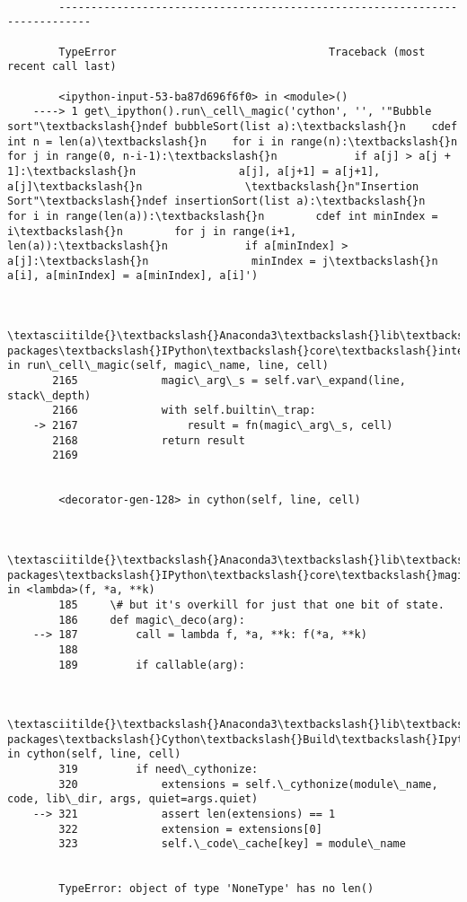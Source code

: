 \documentclass[11pt]{article}
\begin{document}
    \begin{Verbatim}[commandchars=\\\{\}]

        ---------------------------------------------------------------------------

        TypeError                                 Traceback (most recent call last)

        <ipython-input-53-ba87d696f6f0> in <module>()
    ----> 1 get\_ipython().run\_cell\_magic('cython', '', '"Bubble sort"\textbackslash{}ndef bubbleSort(list a):\textbackslash{}n    cdef int n = len(a)\textbackslash{}n    for i in range(n):\textbackslash{}n        for j in range(0, n-i-1):\textbackslash{}n            if a[j] > a[j + 1]:\textbackslash{}n                a[j], a[j+1] = a[j+1], a[j]\textbackslash{}n                \textbackslash{}n"Insertion Sort"\textbackslash{}ndef insertionSort(list a):\textbackslash{}n    for i in range(len(a)):\textbackslash{}n        cdef int minIndex = i\textbackslash{}n        for j in range(i+1, len(a)):\textbackslash{}n            if a[minIndex] > a[j]:\textbackslash{}n                minIndex = j\textbackslash{}n        a[i], a[minIndex] = a[minIndex], a[i]')
    

        \textasciitilde{}\textbackslash{}Anaconda3\textbackslash{}lib\textbackslash{}site-packages\textbackslash{}IPython\textbackslash{}core\textbackslash{}interactiveshell.py in run\_cell\_magic(self, magic\_name, line, cell)
       2165             magic\_arg\_s = self.var\_expand(line, stack\_depth)
       2166             with self.builtin\_trap:
    -> 2167                 result = fn(magic\_arg\_s, cell)
       2168             return result
       2169 
    

        <decorator-gen-128> in cython(self, line, cell)
    

        \textasciitilde{}\textbackslash{}Anaconda3\textbackslash{}lib\textbackslash{}site-packages\textbackslash{}IPython\textbackslash{}core\textbackslash{}magic.py in <lambda>(f, *a, **k)
        185     \# but it's overkill for just that one bit of state.
        186     def magic\_deco(arg):
    --> 187         call = lambda f, *a, **k: f(*a, **k)
        188 
        189         if callable(arg):
    

        \textasciitilde{}\textbackslash{}Anaconda3\textbackslash{}lib\textbackslash{}site-packages\textbackslash{}Cython\textbackslash{}Build\textbackslash{}IpythonMagic.py in cython(self, line, cell)
        319         if need\_cythonize:
        320             extensions = self.\_cythonize(module\_name, code, lib\_dir, args, quiet=args.quiet)
    --> 321             assert len(extensions) == 1
        322             extension = extensions[0]
        323             self.\_code\_cache[key] = module\_name
    

        TypeError: object of type 'NoneType' has no len()

    \end{Verbatim}


    
    
    
    
\end{document}
